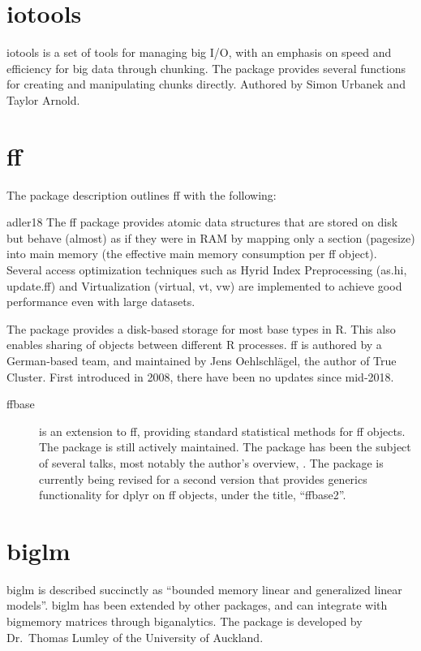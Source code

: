\documentclass[10pt,a4paper]{article}
\begin{document}
\section{iotools}
\label{sec:iotools}

iotools is a set of tools for managing big I/O, with an emphasis on
speed and efficiency for big data through chunking\cite{urbanek20b}.
The package provides several functions for creating and manipulating
chunks directly. Authored by Simon Urbanek and Taylor Arnold.

\section{ff}
\label{sec:ff}

The package description outlines ff with the following:

\begin{displaycquote}{adler18}
  The ff package provides atomic data structures that are stored on
  disk but behave (almost) as if they were in RAM by mapping only a
  section (pagesize) into main memory (the effective main memory
  consumption per ff object). Several access optimization techniques
  such as Hyrid Index Preprocessing (as.hi, update.ff) and
  Virtualization (virtual, vt, vw) are implemented to achieve good
  performance even with large datasets.
\end{displaycquote}

The package provides a disk-based storage for most base types in R.
This also enables sharing of objects between different R processes. ff
is authored by a German-based team, and maintained by Jens
Oehlschlägel, the author of True Cluster. First introduced in
2008\cite{adler08:_large_r}, there have been no updates since
mid-2018.

\begin{description}
\item[ffbase\cite{jonge20}] is an extension to ff, providing standard
  statistical methods for ff objects. The package is still actively
  maintained. The package has been the subject of several talks, most
  notably the author's overview, \textcite{wijffels13}. The package is
  currently being revised for a second version that provides generics
  functionality for dplyr on ff objects, under the title,
  ``ffbase2''\cite{jonge15}.
\end{description}

\section{biglm}
\label{sec:biglm}

biglm is described succinctly as \enquote{bounded memory linear and
  generalized linear models}\cite{lumley13}. biglm has been extended
by other packages, and can integrate with bigmemory matrices through
biganalytics. The package is developed by Dr.~Thomas Lumley of the
University of Auckland.

\printbibliography{}
\end{document}
